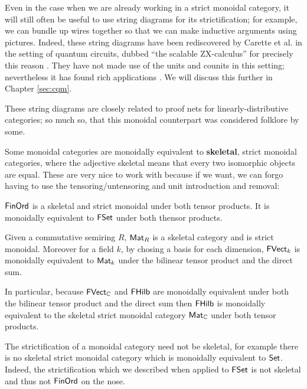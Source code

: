 Even in the case when we are already working in a strict monoidal category, it will still often be useful to use string diagrams for its strictification; for example, we can bundle up wires together so that we can make inductive arguments using pictures.  Indeed, these string diagrams have been rediscovered by Carette et al. in the setting of quantum circuits, dubbed ``the scalable ZX-calculus'' for precisely this reason \cite{szx}.  They have not made use of the units and counits in this setting; nevertheless it has found rich applications \cite{szxi,szxii}.  We will discuss this further in Chapter \ref{sec:cqm}.
\begin{aside}
These string diagrams are closely related to proof nets for linearly-distributive categories; so much so, that this monoidal counterpart was considered folklore by some.  %
\end{aside}
Some monoidal categories are monoidally equivalent to {\bf skeletal}, strict monoidal categories, where the adjective skeletal means that every two isomorphic objects are equal.  These are very nice to work with because if we want, we can forgo having to use the tensoring/untensoring and unit introduction and removal:
\begin{example}
\label{ex:skeleton}
$\mathsf{FinOrd}$ is a skeletal and strict monoidal under both tensor products. It is monoidally equivalent to $\mathsf{FSet}$ under both thensor products.


Given a commutative semiring $R$, $\mathsf{Mat}_R$ is a skeletal category and is strict monoidal. Moreover for a field $k$, by chosing a basis for each dimension,  $\mathsf{FVect}_k$   is monoidally equivalent to $\mathsf{Mat}_k$ under the bilinear tensor product and the direct sum.

In particular, because $\mathsf{FVect}_{\mathbb{C}}$ and $\mathsf{FHilb}$ are monoidally equivalent under both the bilinear tensor product and the direct sum then $\mathsf{FHilb}$ is monoidally equivalent to the skeletal strict monoidal category $\mathsf{Mat}_{\mathbb{C}}$ under both tensor products.
\end{example}
The strictification of a monoidal category need not be skeletal, for example there is no skeletal strict monoidal  category which is monoidally equivalent to $\mathsf{Set}$.  Indeed, the strictification which we described when applied to $\mathsf{FSet}$ is not skeletal and thus not $\mathsf{FinOrd}$ on the nose.


